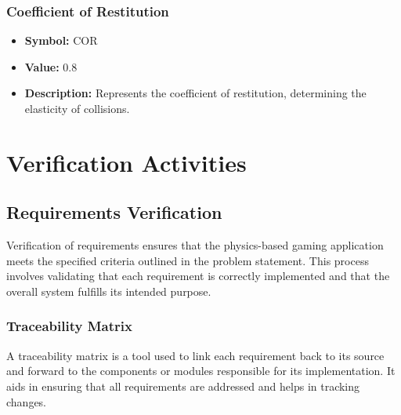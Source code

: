 \documentclass[12pt, titlepage]{article}
\begin{document}
\subsubsection{Coefficient of Restitution}
\begin{itemize}
  \item \textbf{Symbol:} COR
  \item \textbf{Value:} 0.8
  \item \textbf{Description:} Represents the coefficient of restitution, determining the elasticity of collisions.
\end{itemize}

\section{Verification Activities}
\subsection{Requirements Verification}
Verification of requirements ensures that the physics-based gaming application meets the specified criteria outlined in the problem statement. This process involves validating that each requirement is correctly implemented and that the overall system fulfills its intended purpose.

\subsubsection{Traceability Matrix}
A traceability matrix is a tool used to link each requirement back to its source and forward to the components or modules responsible for its implementation. It aids in ensuring that all requirements are addressed and helps in tracking changes.
\end{document}
